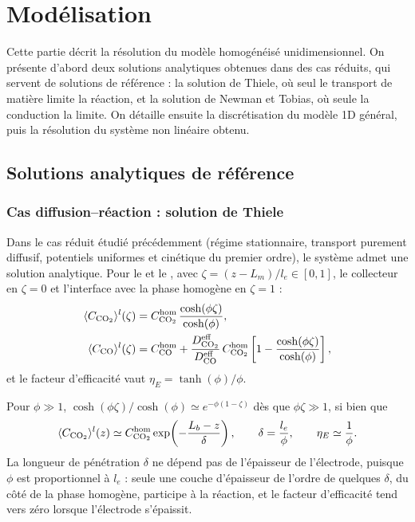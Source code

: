 \section*{Modélisation}

Cette partie décrit la résolution du modèle homogénéisé unidimensionnel. On
présente d'abord deux solutions analytiques obtenues dans des cas réduits,
qui servent de solutions de référence : la solution de Thiele, où seul le
transport de matière limite la réaction, et la solution de Newman et Tobias,
où seule la conduction la limite. On détaille ensuite la discrétisation du
modèle 1D général, puis la résolution du système non linéaire obtenu.

\subsection*{Solutions analytiques de référence}

\subsubsection*{Cas diffusion--réaction : solution de Thiele}

Dans le cas réduit étudié précédemment (régime stationnaire, transport
purement diffusif, potentiels uniformes et cinétique du premier ordre), le
système admet une solution analytique. Pour le  et le , avec
$\zeta = (z - L_m)/l_e \in [0, 1]$, le collecteur en $\zeta = 0$ et
l'interface avec la phase homogène en $\zeta = 1$ :
\begin{align}
\avg{C_{\ce{CO2}}}^l(\zeta)
&= C_{\ce{CO2}}^{\mathrm{hom}}\,
\frac{\cosh(\phi\zeta)}{\cosh(\phi)},
\label{eq:ref_CO2}\\
\avg{C_{\ce{CO}}}^l(\zeta)
&= C_{\ce{CO}}^{\mathrm{hom}}
+ \frac{D_{\ce{CO2}}^{\mathrm{eff}}}{D_{\ce{CO}}^{\mathrm{eff}}}\,
C_{\ce{CO2}}^{\mathrm{hom}}
\left[1 - \frac{\cosh(\phi\zeta)}{\cosh(\phi)}\right],
\label{eq:ref_CO}
\end{align}
et le facteur d'efficacité vaut $\eta_E = \tanh(\phi)/\phi$.

Pour $\phi \gg 1$, $\cosh(\phi\zeta)/\cosh(\phi) \simeq e^{-\phi(1-\zeta)}$
dès que $\phi\zeta \gg 1$, si bien que
\begin{equation}
\avg{C_{\ce{CO2}}}^l(z) \simeq C_{\ce{CO2}}^{\mathrm{hom}}
\exp\!\left(-\frac{L_b - z}{\delta}\right),
\qquad
\delta = \frac{l_e}{\phi},
\qquad
\eta_E \simeq \frac{1}{\phi} .
\label{eq:ref_phi_grand}
\end{equation}
La longueur de pénétration $\delta$ ne dépend pas de l'épaisseur de
l'électrode, puisque $\phi$ est proportionnel à $l_e$ : seule une couche
d'épaisseur de l'ordre de quelques $\delta$, du côté de la phase homogène,
participe à la réaction, et le facteur d'efficacité tend vers zéro lorsque
l'électrode s'épaissit.

